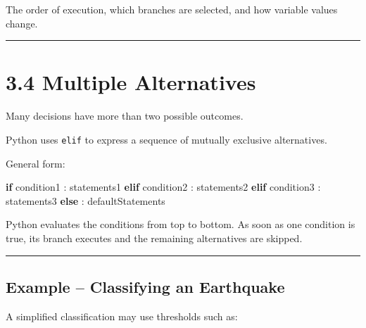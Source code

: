 \documentclass[
  11pt,
  a4paper,
]{article}
\newenvironment{Shaded}{}{}
\newcommand{\ControlFlowTok}[1]{\textcolor[rgb]{0.00,0.44,0.13}{\textbf{#1}}}
\newcommand{\NormalTok}[1]{#1}
\begin{document}
The order of execution, which branches are selected, and how variable
values change.

\begin{center}\rule{0.5\linewidth}{0.5pt}\end{center}

\section{3.4 Multiple Alternatives}\label{multiple-alternatives}

Many decisions have more than two possible outcomes.

Python uses \texttt{elif} to express a sequence of mutually exclusive
alternatives.

General form:

\begin{Shaded}
\begin{Highlighting}[]
\ControlFlowTok{if}\NormalTok{ condition1 :}
\NormalTok{    statements1}
\ControlFlowTok{elif}\NormalTok{ condition2 :}
\NormalTok{    statements2}
\ControlFlowTok{elif}\NormalTok{ condition3 :}
\NormalTok{    statements3}
\ControlFlowTok{else}\NormalTok{ :}
\NormalTok{    defaultStatements}
\end{Highlighting}
\end{Shaded}

Python evaluates the conditions from top to bottom. As soon as one
condition is true, its branch executes and the remaining alternatives
are skipped.

\begin{center}\rule{0.5\linewidth}{0.5pt}\end{center}

\subsection{Example -- Classifying an
Earthquake}\label{example-classifying-an-earthquake}

A simplified classification may use thresholds such as:
\end{document}
